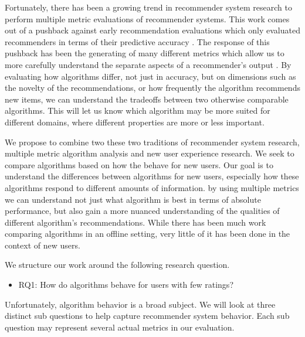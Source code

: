 \documentclass[letterpaper]{sig-alternate}
\begin{document}
  Fortunately, there has been a growing trend in recommender system research to perform multiple metric evaluations of recommender systems.
  This work comes out of a pushback against early recommendation evaluations which only evaluated recommenders in terms of their predictive accuracy \cite{accurateIsNotEnough}.
  The response of this pushback has been the generating of many different metrics which allow us to more carefully understand the separate aspects of a recommender's output \cite{LathiaTemporal, CremonesiTopN, zieglerDiversity}.
  By evaluating how algorithms differ, not just in accuracy, but on dimensions such as the novelty of the recommendations, or how frequently the algorithm recommends new items, we can understand the tradeoffs between two otherwise comparable algorithms.
  This will let us know which algorithm may be more suited for different domains, where different properties are more or less important.

  We propose to combine two these two traditions of recommender system research, multiple metric algorithm analysis and new user experience research.
  We seek to compare algorithms based on how the behave for new users.
  Our goal is to understand the differences between algorithms for new users, especially how these algorithms respond to different amounts of information.
  by using multiple metrics we can understand not just what algorithm is best in terms of absolute performance, but also gain a more nuanced understanding of the qualities of different algorithm's recommendations.
  While there has been much work comparing algorithms in an offline setting, very little of it has been done in the context of new users.

  We structure our work around the following research question.
  \begin{itemize}
    \item RQ1: How do algorithms behave for users with few ratings?
  \end{itemize}
  Unfortunately, algorithm behavior is a broad subject.
  We will look at three distinct sub questions to help capture recommender system behavior.
  Each sub question may represent several actual metrics in our evaluation.
\end{document}
